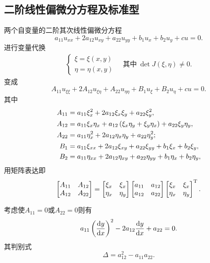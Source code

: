 \subsection{二阶线性偏微分方程及标准型}
两个自变量的二阶其次线性偏微分方程
\[a_{11}u_{xx}+2a_{12}u_{xy}+a_{22}u_{yy}+b_1u_x+b_2u_y+cu=0.\]
进行变量代换
\begin{align*}
	\begin{cases}
		\xi=\xi(x,y) \\
		\eta=\eta(x,y)
	\end{cases}
	\quad\text{其中}~
	\det J(\xi,\eta)\neq 0.
\end{align*}
变成
\[A_{11}u_{\xi\xi}+2A_{12}u_{\xi\eta}+A_{22}u_{\eta\eta}+B_1u_\xi+B_2u_\eta+cu=0.\]
其中
\begin{align*}
	A_{11} & =a_{11}\xi_x^2+2a_{12}\xi_x\xi_y+a_{22}\xi_y^2,                          \\
	A_{12} & =a_{11}\xi_x\eta_x+a_{12}\left(\xi_x\eta_y+\xi_y\eta_x\right)+a_{22}\xi_y\eta_y, \\
	A_{22} & =a_{11}\eta_x^2+2 a_{12}\eta_x\eta_y+a_{22}\eta_y^2;                     \\
	B_1    & =a_{11}\xi_{xx}+2a_{12}\xi_{xy}+a_{22}\xi_{yy}+b_1\xi_x+b_2\xi_y,        \\
	B_2    & =a_{11}\eta_{xx}+2a_{12}\eta_{xy}+a_{22}\eta_{yy}+b_1\eta_x+b_2\eta_y,
\end{align*}
用矩阵表达即
\begin{align*}
	\begin{bmatrix}
		A_{11} & A_{12} \\
		A_{12} & A_{22}
	\end{bmatrix}=\begin{bmatrix}
		\xi_x  & \xi_x  \\
		\eta_x & \eta_y
	\end{bmatrix}\begin{bmatrix}
		a_{11} & a_{12} \\
		a_{12} & a_{22}
	\end{bmatrix}\begin{bmatrix}
		\xi_x  & \xi_x  \\
		\eta_x & \eta_y
	\end{bmatrix}^{\mathrm T}.
\end{align*}

考虑使$A_{11}=0$或$A_{22}=0$则有
\[a_{11}\kh{\dv yx}^2-2a_{12}\dv yx+a_{22}=0.\]
其判别式
\[\Delta=a_{12}^2-a_{11}a_{22}.\]
